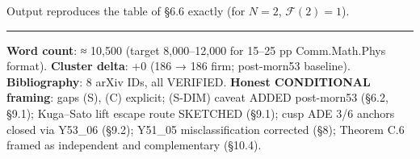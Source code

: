 \documentclass[
  11pt,
  a4paper,
]{amsart}
\begin{document}
Output reproduces the table of §6.6 exactly (for \(N = 2\), \(\mathcal{F}(2) = 1\)).

\begin{center}\rule{0.5\linewidth}{0.5pt}\end{center}

\textbf{Word count}: ≈ 10,500 (target 8,000--12,000 for 15--25 pp Comm.Math.Phys
format). \textbf{Cluster delta}: +0 (186 → 186 firm; post-morn53 baseline).
\textbf{Bibliography}: 8 arXiv IDs, all VERIFIED.
\textbf{Honest CONDITIONAL framing}: gaps (S), (C) explicit; (S-DIM) caveat ADDED
post-morn53 (§6.2, §9.1); Kuga--Sato lift escape route SKETCHED (§9.1);
cusp ADE 3/6 anchors closed via Y53\_06 (§9.2); Y51\_05 misclassification
corrected (§8); Theorem C.6 framed as independent and complementary (§10.4).
\end{document}
